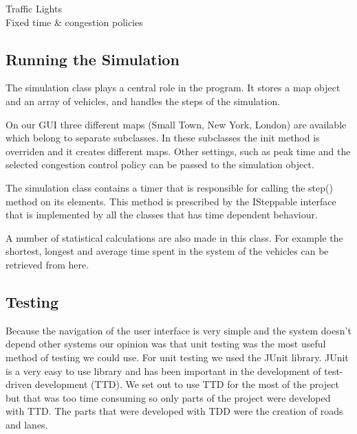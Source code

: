 \documentclass[11pt]{article}
\begin{document}
Traffic Lights
\\
Fixed time \& congestion policies

\subsection{Running the Simulation}

The simulation class plays a central role in the program. It stores a map object and an array of vehicles, and handles the steps of the simulation. 

On our GUI three different maps (Small Town, New York, London) are available which belong to separate subclasses. In these subclasses the init method is overriden and it creates different maps. Other settings, such as peak time and the selected congestion control policy can be passed to the simulation object.

The simulation class contains a timer that is responsible for calling the step() method on its elements. This method is prescribed by the ISteppable interface that is implemented by all the classes that has time dependent behaviour.

A number of statistical calculations are also made in this class. For example the shortest, longest and average time spent in the system of the vehicles can be retrieved from here.

\subsection{Testing}
Because the navigation of the user interface is very simple and the system doesn't depend other systems our opinion was that unit testing was the most useful method of testing we could use. For unit testing we used the JUnit library. JUnit is a very easy to use library and has been important in the development of test-driven development (TTD). We set out to use TTD for the most of the project but that was too time consuming so only parts of the project were developed with TTD. The parts that were developed with TDD were the creation of roads and lanes.
\end{document}

